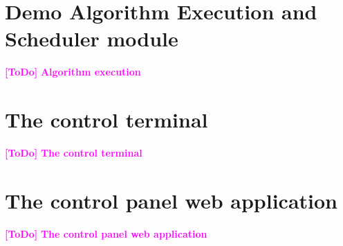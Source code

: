 \documentclass[a4paper,12pt]{article}
\newcommand{\ToDo}[1]{\textcolor{magenta}{\textbf{[ToDo]} \textbf{#1}}}
\begin{document}






\section{Demo Algorithm Execution and Scheduler module}
\ToDo{Algorithm execution}

\section{The control terminal}
\ToDo{The control terminal}

\section{The control panel web application}
\ToDo{The control panel web application}




\end{document}
